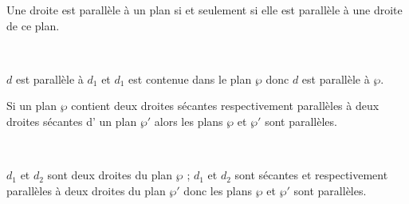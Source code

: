 \documentclass{cornouaille}
\begin{document}
\begin{propriete}
  Une droite est parallèle à un plan si et seulement si elle est
  parallèle à une droite de ce plan.
\end{propriete}

\begin{exemple}~\par
  \begin{minipage}{.45\linewidth}
    $d$ est parallèle à $d_1$ et $d_1$ est contenue dans le plan $\wp$
    donc $d$ est parallèle à $\wp$.
  \end{minipage}
  \hfill
  \begin{minipage}{.45\linewidth}
  \end{minipage}
\end{exemple}

\begin{propriete}
  Si un plan $\wp$ contient deux droites sécantes respectivement
  parallèles à deux droites sécantes d' un plan $\wp'$ alors les plans
  $\wp$ et $\wp'$ sont parallèles.
\end{propriete}
          
\begin{exemple}~\par
  \begin{minipage}{.45\linewidth}
    $d_1$ et $d_2$ sont deux droites du plan $\wp$ ; $d_1$ et $d_2$
    sont sécantes et respectivement parallèles à deux droites du plan
    $\wp'$ donc les plans $\wp$ et $\wp'$ sont parallèles.
  \end{minipage}
  \hfill
  \begin{minipage}{.45\linewidth}
  \end{minipage}
\end{exemple}
\end{document}
